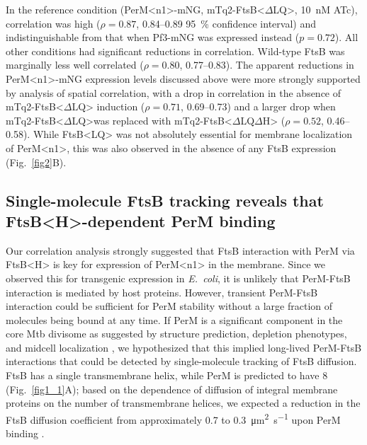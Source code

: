 \documentclass[twocolumn,pdflatex,sn-nature]{sn-jnl}%
\def\textsuperscript#1{<#1>}%
\newcommand\ec{\textit{E.~coli}}
\newcommand\mtb{Mtb}
\newcommand\ftsbLQ{FtsB\textsuperscript{LQ}}
\newcommand\ftsbH{FtsB\textsuperscript{H}}
\newcommand\ftsbdLQ{FtsB\textsuperscript{$\Delta{}$LQ}}
\newcommand\ftsbdLQdH{FtsB\textsuperscript{$\Delta{}$LQ$\Delta{}$H}}
\newcommand\permN{PerM\textsuperscript{n1}}
\begin{document}
In the reference condition (\permN{}-mNG, mTq2-\ftsbdLQ{}, \qty{10}{nM} ATc), correlation was high ($\rho = 0.87$, 0.84--0.89 \qty{95}{\percent} confidence interval) and indistinguishable from that when Pf3-mNG was expressed instead ($p = 0.72$).
All other conditions had significant reductions in correlation. Wild-type FtsB was marginally less well correlated ($\rho = 0.80$, 0.77--0.83).
The apparent reductions in \permN{}-mNG expression levels discussed above were more strongly supported by analysis of spatial correlation, with a drop in correlation in the absence of mTq2-\ftsbdLQ{} induction ($\rho = 0.71$, 0.69--0.73) and a larger drop when mTq2-\ftsbdLQ was replaced with mTq2-\ftsbdLQdH{} ($\rho = 0.52$, 0.46--0.58).
While \ftsbLQ{} was not absolutely essential for membrane localization of \permN{}, this was also observed in the absence of any FtsB expression (Fig.~\ref{fig2}B).

\subsection{Single-molecule FtsB tracking reveals that \ftsbH{}-dependent PerM binding}

Our correlation analysis strongly suggested that FtsB interaction with PerM via \ftsbH{} is key for expression of \permN{} in the membrane.
Since we observed this for transgenic expression in \ec{}, it is unlikely that PerM-FtsB interaction is mediated by host proteins.
However, transient PerM-FtsB interaction could be sufficient for PerM stability without a large fraction of molecules being bound at any time.
If PerM is a significant component in the core \mtb{} divisome as suggested by structure prediction, depletion phenotypes, and midcell localization \citep{goodsmithDisruptionTuberculosisMembrane2015, wangPersistentMycobacteriumTuberculosis2019}, we hypothesized that this implied long-lived PerM-FtsB interactions that could be detected by single-molecule tracking of FtsB diffusion.
FtsB has a single transmembrane helix, while PerM is predicted to have 8 (Fig.~\ref{fig1_1}A); based on the dependence of diffusion of integral membrane proteins on the number of transmembrane helices, we expected a reduction in the FtsB diffusion coefficient from approximately 0.7 to \qty{0.3}{\square\um\per\s} upon PerM binding \citep{lucenaMicrodomainFormationGeneral2018}.
\end{document}
